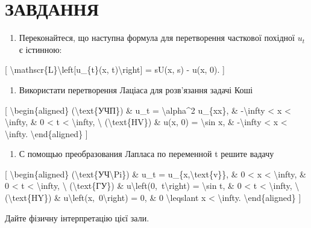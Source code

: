 \documentclass[
]{article}
\providecommand{\tightlist}{%
  \setlength{\itemsep}{0pt}\setlength{\parskip}{0pt}}
\begin{document}
\section{ЗАВДАННЯ}\label{ux437ux430ux432ux434ux430ux43dux43dux44f-8}

\begin{enumerate}
\def\labelenumi{\arabic{enumi}.}
\tightlist
\item
  Переконайтеся, що наступна формула для перетворення часткової похідної
  \(u_t\) є істинною:
\end{enumerate}

{[} \textbackslash mathscr\{L\}\textbackslash left{[}u\_\{t\}(x,
t)\textbackslash right{]} = sU(x, s) - u(x, 0). {]}

\begin{enumerate}
\def\labelenumi{\arabic{enumi}.}
\setcounter{enumi}{1}
\tightlist
\item
  Використати перетворення Лаціаса для розв'язання задачі Коші
\end{enumerate}

{[} \textbackslash begin\{aligned\} (\textbackslash text\{УЧП\}) \& u\_t
= \textbackslash alpha\^{}2 u\_\{xx\}, \& -\textbackslash infty
\textless{} x \textless{} \textbackslash infty, \& 0 \textless{} t
\textless{} \textbackslash infty, \textbackslash{}
(\textbackslash text\{HV\}) \& u(x, 0) = \textbackslash sin x, \&
-\textbackslash infty \textless{} x \textless{} \textbackslash infty.
\textbackslash end\{aligned\} {]}

\begin{enumerate}
\def\labelenumi{\arabic{enumi}.}
\setcounter{enumi}{2}
\tightlist
\item
  С помощью преобразования Лапласа по переменной t решите вадачу
\end{enumerate}

{[} \textbackslash begin\{aligned\}
(\textbackslash text\{УЧ\textbackslash Pi\}) \& u\_t =
u\_\{x,\textbackslash text\{v\}\}, \& 0 \textless{} x \textless{}
\textbackslash infty, \& 0 \textless{} t \textless{}
\textbackslash infty, \textbackslash{} (\textbackslash text\{ГУ\}) \&
u\textbackslash left(0,~t\textbackslash right) = \textbackslash sin t,
\& 0 \textless{} t \textless{} \textbackslash infty, \textbackslash{}
(\textbackslash text\{HY\}) \&
u\textbackslash left(x,~0\textbackslash right) = 0, \& 0
\textbackslash leqslant x \textless{} \textbackslash infty.
\textbackslash end\{aligned\} {]}

Дайте фізичну інтерпретацію цієї зали.
\end{document}
